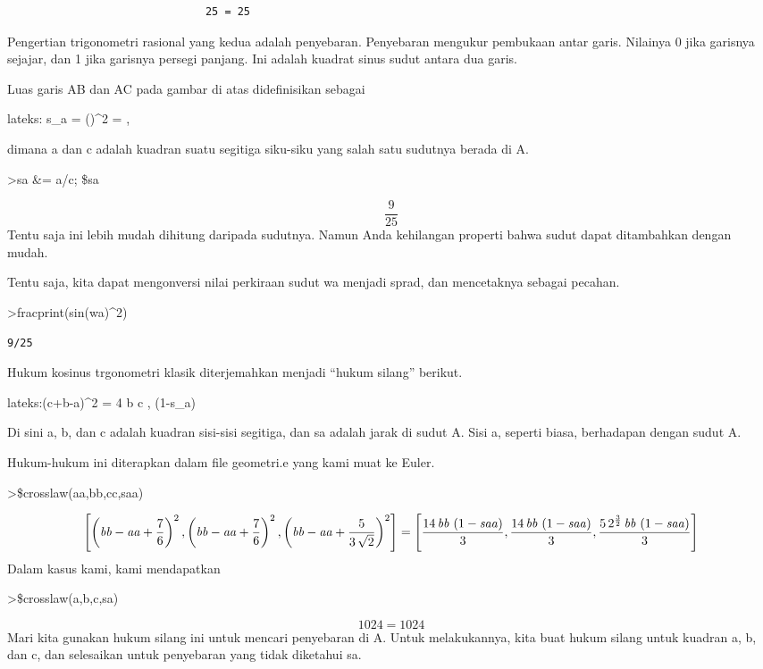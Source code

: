 \documentclass[
]{book}
\begin{document}
\begin{verbatim}
                               25 = 25
\end{verbatim}

Pengertian trigonometri rasional yang kedua adalah penyebaran. Penyebaran mengukur pembukaan antar garis. Nilainya 0 jika garisnya sejajar, dan 1 jika garisnya persegi panjang. Ini adalah kuadrat sinus sudut antara dua garis.

Luas garis AB dan AC pada gambar di atas didefinisikan sebagai

lateks: s\_a = \sin(\alpha)\^{}2 = ,

dimana a dan c adalah kuadran suatu segitiga siku-siku yang salah satu sudutnya berada di A.

\textgreater sa \&= a/c; \$sa

\[\frac{9}{25}\]Tentu saja ini lebih mudah dihitung daripada sudutnya. Namun Anda kehilangan properti bahwa sudut dapat ditambahkan dengan mudah.

Tentu saja, kita dapat mengonversi nilai perkiraan sudut wa menjadi sprad, dan mencetaknya sebagai pecahan.

\textgreater fracprint(sin(wa)\^{}2)

\begin{verbatim}
9/25
\end{verbatim}

Hukum kosinus trgonometri klasik diterjemahkan menjadi ``hukum silang'' berikut.

lateks:(c+b-a)\^{}2 = 4 b c , (1-s\_a)

Di sini a, b, dan c adalah kuadran sisi-sisi segitiga, dan sa adalah jarak di sudut A. Sisi a, seperti biasa, berhadapan dengan sudut A.

Hukum-hukum ini diterapkan dalam file geometri.e yang kami muat ke Euler.

\textgreater\$crosslaw(aa,bb,cc,saa)

\[\left[ \left({\it bb}-{\it aa}+\frac{7}{6}\right)^2 , \left(  {\it bb}-{\it aa}+\frac{7}{6}\right)^2 , \left({\it bb}-{\it aa}+  \frac{5}{3\,\sqrt{2}}\right)^2 \right] =\left[ \frac{14\,{\it bb}\,  \left(1-{\it saa}\right)}{3} , \frac{14\,{\it bb}\,\left(1-{\it saa}  \right)}{3} , \frac{5\,2^{\frac{3}{2}}\,{\it bb}\,\left(1-{\it saa}  \right)}{3} \right] \]Dalam kasus kami, kami mendapatkan

\textgreater\$crosslaw(a,b,c,sa)

\[1024=1024\]Mari kita gunakan hukum silang ini untuk mencari penyebaran di A. Untuk melakukannya, kita buat hukum silang untuk kuadran a, b, dan c, dan selesaikan untuk penyebaran yang tidak diketahui sa.
\end{document}
